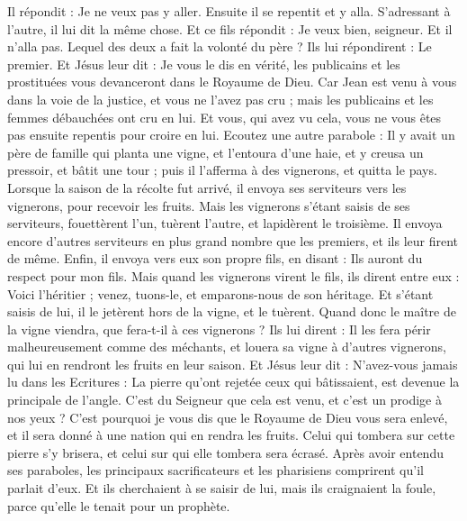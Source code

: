 \begin{multicols}{2}
Il répondit : Je ne veux pas y aller. Ensuite il se repentit et y alla.
S'adressant à l'autre, il lui dit la même chose. Et ce fils répondit : Je veux bien, seigneur. Et il n'alla pas.
Lequel des deux a fait la volonté du père ? Ils lui répondirent : Le premier. Et Jésus leur dit : Je vous le dis en vérité, les publicains et les prostituées vous devanceront dans le Royaume de Dieu.
Car Jean est venu à vous dans la voie de la justice, et vous ne l'avez pas cru ; mais les publicains et les femmes débauchées ont cru en lui. Et vous, qui avez vu cela, vous ne vous êtes pas ensuite repentis pour croire en lui.
Ecoutez une autre parabole : Il y avait un père de famille qui planta une vigne, et l'entoura d'une haie, et y creusa un pressoir, et bâtit une tour ; puis il l'afferma à des vignerons, et quitta le pays.
Lorsque la saison de la récolte fut arrivé, il envoya ses serviteurs vers les vignerons, pour recevoir les fruits.
Mais les vignerons s'étant saisis de ses serviteurs, fouettèrent l'un, tuèrent l'autre, et lapidèrent le troisième.
Il envoya encore d'autres serviteurs en plus grand nombre que les premiers, et ils leur firent de même.
Enfin, il envoya vers eux son propre fils, en disant : Ils auront du respect pour mon fils.
Mais quand les vignerons virent le fils, ils dirent entre eux : Voici l'héritier ; venez, tuons-le, et emparons-nous de son héritage.
Et s'étant saisis de lui, il le jetèrent hors de la vigne, et le tuèrent.
Quand donc le maître de la vigne viendra, que fera-t-il à ces vignerons ?
Ils lui dirent : Il les fera périr malheureusement comme des méchants, et louera sa vigne à d'autres vignerons, qui lui en rendront les fruits en leur saison.
Et Jésus leur dit : N'avez-vous jamais lu dans les Ecritures : La pierre qu'ont rejetée ceux qui bâtissaient, est devenue la principale de l'angle. C'est du Seigneur que cela est venu, et c'est un prodige à nos yeux ?
C'est pourquoi je vous dis que le Royaume de Dieu vous sera enlevé, et il sera donné à une nation qui en rendra les fruits.
Celui qui tombera sur cette pierre s'y brisera, et celui sur qui elle tombera sera écrasé.
Après avoir entendu ses paraboles, les principaux sacrificateurs et les pharisiens comprirent qu'il parlait d'eux.
Et ils cherchaient à se saisir de lui, mais ils craignaient la foule, parce qu'elle le tenait pour un prophète.

\end{multicols}
